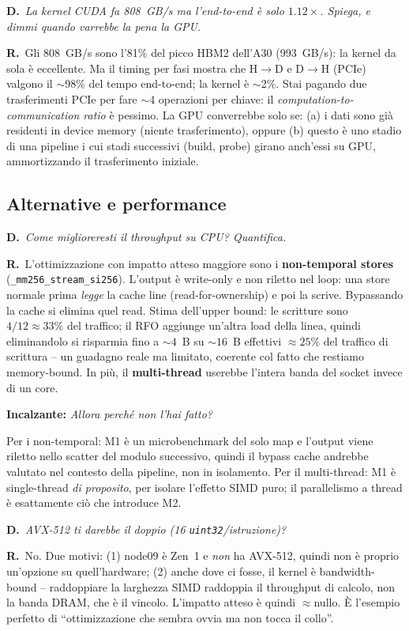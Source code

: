 \documentclass[11pt,a4paper]{article}
\newcommand{\D}[1]{\begin{dom}\small\textbf{D.}\ \itshape #1\end{dom}}
\newcommand{\R}{\noindent\textbf{R.}\ }
\newcommand{\Inc}[1]{\par\smallskip\noindent\textbf{\textcolor{red!55!black}{Incalzante:}} \textit{#1}\ \par}
\begin{document}
\D{La kernel CUDA fa 808~GB/s ma l'end-to-end è solo $1.12\times$. Spiega, e dimmi quando varrebbe la pena la GPU.}
\R Gli 808~GB/s sono l'81\% del picco HBM2 dell'A30 (993~GB/s): la kernel da sola è eccellente. Ma il timing per fasi mostra che H$\to$D e D$\to$H (PCIe) valgono il $\sim$98\% del tempo end-to-end; la kernel è $\sim$2\%. Stai pagando due trasferimenti PCIe per fare $\sim$4 operazioni per chiave: il \emph{computation-to-communication ratio} è pessimo. La GPU converrebbe solo se: (a) i dati sono già residenti in device memory (niente trasferimento), oppure (b) questo è uno stadio di una pipeline i cui stadi successivi (build, probe) girano anch'essi su GPU, ammortizzando il trasferimento iniziale.

\subsection{Alternative e performance}

\D{Come miglioreresti il throughput su CPU? Quantifica.}
\R L'ottimizzazione con impatto atteso maggiore sono i \textbf{non-temporal stores} (\texttt{\_mm256\_stream\_si256}). L'output è write-only e non riletto nel loop: una store normale prima \emph{legge} la cache line (read-for-ownership) e poi la scrive. Bypassando la cache si elimina quel read. Stima dell'upper bound: le scritture sono $4/12\approx33\%$ del traffico; il RFO aggiunge un'altra load della linea, quindi eliminandolo si risparmia fino a $\sim4$~B su $\sim16$~B effettivi $\approx 25\%$ del traffico di scrittura -- un guadagno reale ma limitato, coerente col fatto che restiamo memory-bound. In più, il \textbf{multi-thread} userebbe l'intera banda del socket invece di un core.
\Inc{Allora perché non l'hai fatto?} Per i non-temporal: M1 è un microbenchmark del solo map e l'output viene riletto nello scatter del modulo successivo, quindi il bypass cache andrebbe valutato nel contesto della pipeline, non in isolamento. Per il multi-thread: M1 è single-thread \emph{di proposito}, per isolare l'effetto SIMD puro; il parallelismo a thread è esattamente ciò che introduce M2.

\D{AVX-512 ti darebbe il doppio (16 \texttt{uint32}/istruzione)?}
\R No. Due motivi: (1) node09 è Zen~1 e \emph{non} ha AVX-512, quindi non è proprio un'opzione su quell'hardware; (2) anche dove ci fosse, il kernel è bandwidth-bound -- raddoppiare la larghezza SIMD raddoppia il throughput di calcolo, non la banda DRAM, che è il vincolo. L'impatto atteso è quindi $\approx$nullo. È l'esempio perfetto di ``ottimizzazione che sembra ovvia ma non tocca il collo''.
\end{document}
